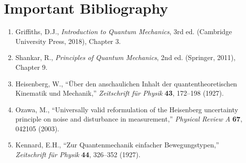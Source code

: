 \section*{Important Bibliography}
\begin{enumerate}
\item Griffiths, D.J., \textit{Introduction to Quantum Mechanics}, 3rd ed. (Cambridge University Press, 2018), Chapter 3.
\item Shankar, R., \textit{Principles of Quantum Mechanics}, 2nd ed. (Springer, 2011), Chapter 9.
\item Heisenberg, W., ``Über den anschaulichen Inhalt der quantentheoretischen Kinematik und Mechanik,'' \textit{Zeitschrift für Physik} \textbf{43}, 172--198 (1927).
\item Ozawa, M., ``Universally valid reformulation of the Heisenberg uncertainty principle on noise and disturbance in measurement,'' \textit{Physical Review A} \textbf{67}, 042105 (2003).
\item Kennard, E.H., ``Zur Quantenmechanik einfacher Bewegungstypen,'' \textit{Zeitschrift für Physik} \textbf{44}, 326--352 (1927).
\end{enumerate}

